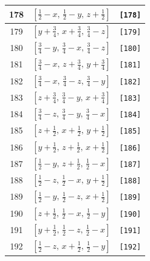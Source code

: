 \documentclass[fleqn,8pt]{jsarticle}
\begin{document}
\begin{longtable}{ccc}
178 & $\left[ \frac{1}{2} - x,\, \frac{1}{2} - y,\, z + \frac{1}{2} \right]$ & {\tt [178]} \\ \hline
179 & $\left[ y + \frac{3}{4},\, x + \frac{3}{4},\, \frac{3}{4} - z \right]$ & {\tt [179]} \\ \hline
180 & $\left[ \frac{3}{4} - y,\, \frac{3}{4} - x,\, \frac{3}{4} - z \right]$ & {\tt [180]} \\ \hline
181 & $\left[ \frac{3}{4} - x,\, z + \frac{3}{4},\, y + \frac{3}{4} \right]$ & {\tt [181]} \\ \hline
182 & $\left[ \frac{3}{4} - x,\, \frac{3}{4} - z,\, \frac{3}{4} - y \right]$ & {\tt [182]} \\ \hline
183 & $\left[ z + \frac{3}{4},\, \frac{3}{4} - y,\, x + \frac{3}{4} \right]$ & {\tt [183]} \\ \hline
184 & $\left[ \frac{3}{4} - z,\, \frac{3}{4} - y,\, \frac{3}{4} - x \right]$ & {\tt [184]} \\ \hline
185 & $\left[ z + \frac{1}{2},\, x + \frac{1}{2},\, y + \frac{1}{2} \right]$ & {\tt [185]} \\ \hline
186 & $\left[ y + \frac{1}{2},\, z + \frac{1}{2},\, x + \frac{1}{2} \right]$ & {\tt [186]} \\ \hline
187 & $\left[ \frac{1}{2} - y,\, z + \frac{1}{2},\, \frac{1}{2} - x \right]$ & {\tt [187]} \\ \hline
188 & $\left[ \frac{1}{2} - z,\, \frac{1}{2} - x,\, y + \frac{1}{2} \right]$ & {\tt [188]} \\ \hline
189 & $\left[ \frac{1}{2} - y,\, \frac{1}{2} - z,\, x + \frac{1}{2} \right]$ & {\tt [189]} \\ \hline
190 & $\left[ z + \frac{1}{2},\, \frac{1}{2} - x,\, \frac{1}{2} - y \right]$ & {\tt [190]} \\ \hline
191 & $\left[ y + \frac{1}{2},\, \frac{1}{2} - z,\, \frac{1}{2} - x \right]$ & {\tt [191]} \\ \hline
192 & $\left[ \frac{1}{2} - z,\, x + \frac{1}{2},\, \frac{1}{2} - y \right]$ & {\tt [192]} \\
\end{longtable}
\end{document}
